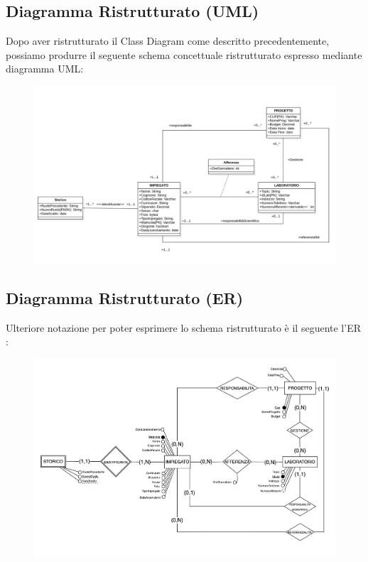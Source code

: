 \newpage
\subsection{Diagramma Ristrutturato (UML)}
Dopo aver ristrutturato il Class Diagram come descritto precedentemente, possiamo produrre il seguente schema concettuale ristrutturato espresso mediante diagramma UML:

\begin{figure}[h!]

\includegraphics[width=\textwidth]{images/CONCETTUALE_RISTRUTTURATO.png}
\end{figure}

\newpage

\subsection{Diagramma Ristrutturato (ER)}
Ulteriore notazione per poter esprimere lo schema ristrutturato è il seguente l'ER :

\begin{figure}[h!]

\includegraphics[width=\textwidth]{images/ER_RISTRUTTURATO.png}
\end{figure}